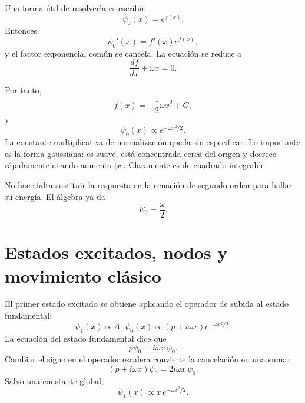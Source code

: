 \begin{classroomqa}
\end{classroomqa}

Una forma útil de resolverla es escribir
\begin{equation}
\psi_{0}(x)=e^{f(x)}.
\end{equation}
Entonces
\[
\psi_{0}'(x)=f'(x)e^{f(x)},
\]
y el factor exponencial común se cancela. La ecuación se reduce a
\begin{equation}
\frac{df}{dx}+\omega x=0.
\end{equation}

\begin{classroomqa}
\end{classroomqa}

Por tanto,
\begin{equation}
f(x)=-\frac12\omega x^{2}+C,
\end{equation}
y
\begin{equation}
\psi_{0}(x)\propto e^{-\omega x^{2}/2}.
\end{equation}
La constante multiplicativa de normalización queda sin especificar. Lo importante es la forma gaussiana: es suave, está concentrada cerca del origen y decrece rápidamente cuando aumenta \(\lvert x\rvert\). Claramente es de cuadrado integrable.

No hace falta sustituir la respuesta en la ecuación de segundo orden para hallar su energía. El álgebra ya da
\begin{equation}
E_{0}=\frac{\omega}{2}.
\end{equation}

\section{Estados excitados, nodos y movimiento clásico}

El primer estado excitado se obtiene aplicando el operador de subida al estado fundamental:
\begin{equation}
\psi_{1}(x)\propto A_{+}\psi_{0}(x)
\propto(p+i\omega x)e^{-\omega x^{2}/2}.
\end{equation}
La ecuación del estado fundamental dice que
\[
p\psi_{0}=i\omega x\,\psi_{0}.
\]
Cambiar el signo en el operador escalera convierte la cancelación en una suma:
\begin{equation}
(p+i\omega x)\psi_{0}
=2i\omega x\,\psi_{0}.
\end{equation}
Salvo una constante global,
\begin{equation}
\psi_{1}(x)\propto x\,e^{-\omega x^{2}/2}.
\end{equation}

